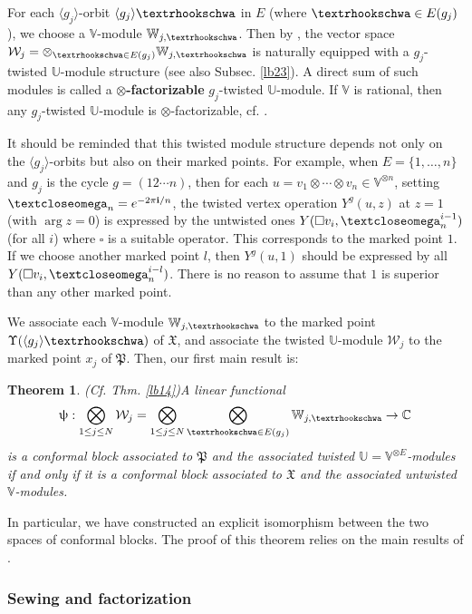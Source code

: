 \documentclass[11pt,b5paper,notitlepage]{article}
\theoremstyle{definition}
\theoremstyle{plain}
\newtheorem{Mthm}{Theorem}
\newcommand{\fk}{\mathfrak}
\newcommand{\mc}{\mathcal}
\newcommand{\bk}[1]{\langle {#1}\rangle}
\newcommand{\im}{\mathbf{i}}
\newcommand{\Vbb}{\mathbb V}
\newcommand{\Ubb}{\mathbb U}
\newcommand{\Wbb}{\mathbb W}
\newcommand{\Cbb}{\mathbb C}
\newcommand{\tipaomega}{\text{\textcloseomega}}
\newcommand{\tipae}{\text{\textrhookschwa}}
\numberwithin{equation}{subsection}
\begin{document}
For each $\bk{g_j}$-orbit $\bk{g_j}\tipae$ in $E$ (where $\tipae\in E(g_j)$), we choose a $\Vbb$-module $\Wbb_{j,\tipae}$. Then by \cite{BDM02}, the vector space $\mc W_j=\otimes_{\tipae\in E(g_j)}\Wbb_{j,\tipae}$ is naturally equipped with a $g_j$-twisted $\Ubb$-module structure (see also Subsec. \ref{lb23}). A direct sum of such modules is called a \textbf{$\otimes$-factorizable} $g_j$-twisted $\Ubb$-module. If $\Vbb$ is rational, then any $g_j$-twisted $\Ubb$-module is $\otimes$-factorizable, cf. \cite[Thm. 6.4]{BDM02}.


It should be reminded that this twisted module structure depends not only on the $\bk{g_j}$-orbits but also on their marked points. For example, when $E=\{1,\dots,n\}$ and $g_j$ is the cycle $g=(12\cdots n)$, then for each $u=v_1\otimes\cdots \otimes v_n\in\Vbb^{\otimes n}$, setting $\tipaomega_n=e^{-2\pi\im/n}$, the twisted vertex operation $Y^g(u,z)$ at $z=1$ (with $\arg z=0$) is expressed by the untwisted ones $Y(\square v_i,\tipaomega_n^{i-1})$ (for all $i$) where $\square$ is a suitable operator. This corresponds to the marked point $1$. If we choose another marked point $l$, then $Y^g(u,1)$ should be expressed by all  $Y(\square v_i,\tipaomega_n^{i-l})$. There is no reason to assume that $1$ is superior than any other marked point.

We associate each $\Vbb$-module $\Wbb_{j,\tipae}$ to the marked point $\Upsilon(\bk{g_j}\tipae)$ of $\fk X$, and associate the twisted $\Ubb$-module $\mc W_j$ to the marked point $x_j$ of $\fk P$. Then, our first main result is:
\begin{Mthm}(Cf. Thm. \ref{lb14})\label{lb69}
A linear functional
\begin{align*}
\uppsi:\bigotimes_{1\leq j\leq N}\mc W_j=\bigotimes_{1\leq j\leq N}\bigotimes_{\tipae\in E(g_j)}\Wbb_{j,\tipae}\rightarrow\Cbb
\end{align*}
is a conformal block associated to $\fk P$ and the associated twisted $\Ubb=\Vbb^{\otimes E}$-modules if and only if it is a conformal block associated to $\fk X$ and the associated untwisted $\Vbb$-modules.
\emph{}
\end{Mthm}
In particular, we have constructed an explicit isomorphism between the two spaces of conformal blocks. The proof of this theorem relies on the main results of \cite{Gui24b}.


\subsubsection*{Sewing and factorization}
\end{document}
